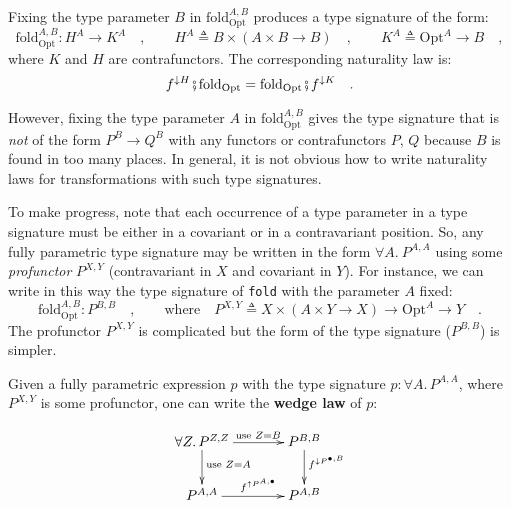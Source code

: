 Fixing the type parameter $B$ in $\text{fold}_{\text{Opt}}^{A,B}$
produces a type signature of the form:
\[
\text{fold}_{\text{Opt}}^{A,B}:H^{A}\rightarrow K^{A}\quad,\quad\quad H^{A}\triangleq B\times\left(A\times B\rightarrow B\right)\quad,\quad\quad K^{A}\triangleq\text{Opt}^{A}\rightarrow B\quad,
\]
where $K$ and $H$ are contrafunctors. The corresponding naturality
law is:
\[
f^{\downarrow H}\bef\text{fold}_{\text{Opt}}=\text{fold}_{\text{Opt}}\bef f^{\downarrow K}\quad.
\]

However, fixing the type parameter $A$ in $\text{fold}_{\text{Opt}}^{A,B}$
gives the type signature that is \emph{not} of the form $P^{B}\rightarrow Q^{B}$
with any functors or contrafunctors $P$, $Q$ because $B$ is found
in too many places. In general, it is not obvious how to write naturality
laws for transformations with such type signatures. 

To make progress, note that each occurrence of a type parameter in
a type signature must be either in a covariant or in a contravariant
position. So, any fully parametric type signature may be written in
the form $\forall A.\:P^{A,A}$ using some \emph{profunctor} $P^{X,Y}$
(contravariant in $X$ and covariant in $Y$). For instance, we can
write in this way the type signature of \lstinline!fold! with the
parameter $A$ fixed:
\[
\text{fold}_{\text{Opt}}^{A,B}:P^{B,B}\quad,\quad\quad\text{where}\quad P^{X,Y}\triangleq X\times(A\times Y\rightarrow X)\rightarrow\text{Opt}^{A}\rightarrow Y\quad.
\]
The profunctor $P^{X,Y}$ is complicated but the form of the type
signature ($P^{B,B}$) is simpler.

Given a fully parametric expression $p$ with the type signature $p:\forall A.\,P^{A,A}$,
where $P^{X,Y}$ is some profunctor, one can write the \textbf{wedge
law} of $p$:

\begin{wrapfigure}[9]{l}{0.26\columnwidth}%
\vspace{-1.3\baselineskip}
\[
\xymatrix{\xyScaleY{2.0pc}\xyScaleX{3.0pc}\forall Z.\,P^{Z,Z}\ar[d]\sp(0.4){\text{use }Z=A}\ar[r]\sp(0.55){\text{use }Z=B} & P^{B,B}\ar[d]\sp(0.37){f^{\downarrow P^{\bullet,B}}}\\
P^{A,A}\ar[r]\sp(0.55){f^{\uparrow P^{A,\bullet}}} & P^{A,B}
}
\]

\vspace{-0.4\baselineskip}
\end{wrapfigure}%

~\vspace{-0.8\baselineskip}

